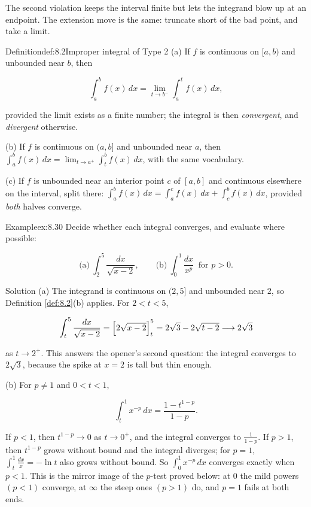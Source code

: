 \documentclass[a4paper,12pt,oneside]{memoir}
\begin{document}
The second violation keeps the interval finite but lets the integrand blow up at an endpoint. The extension move is the same: truncate short of the bad point, and take a limit.

\begin{envdefinition}{Definition}{def:8.2}{Improper integral of Type 2}
(a) If \(f\) is continuous on \([a, b)\) and unbounded near \(b\), then

\[ \int_{a}^{b} f(x)\,dx = \lim_{t \to b^{-}} \int_{a}^{t} f(x)\,dx, \]

provided the limit exists as a finite number; the integral is then \emph{convergent}, and \emph{divergent} otherwise.

(b) If \(f\) is continuous on \((a, b]\) and unbounded near \(a\), then \(\displaystyle\int_{a}^{b} f(x)\,dx = \lim_{t \to a^{+}} \int_{t}^{b} f(x)\,dx\), with the same vocabulary.

(c) If \(f\) is unbounded near an interior point \(c\) of \([a, b]\) and continuous elsewhere on the interval, split there: \(\displaystyle\int_{a}^{b} f(x)\,dx = \int_{a}^{c} f(x)\,dx + \int_{c}^{b} f(x)\,dx\), provided \emph{both} halves converge.
\end{envdefinition}
\begin{workedexample}
\begin{envexample}{Example}{ex:8.30}{}
Decide whether each integral converges, and evaluate where possible:

\[ \text{(a)}\ \int_{2}^{5} \frac{dx}{\sqrt{x - 2}}, \qquad \text{(b)}\ \int_{0}^{1} \frac{dx}{x^{p}} \ \text{ for } p > 0. \]
\end{envexample}
\begin{envsolution}{Solution}{}{}
(a) The integrand is continuous on \((2, 5]\) and unbounded near \(2\), so Definition \ref{def:8.2}(b) applies. For \(2 < t < 5\),

\[ \int_{t}^{5} \frac{dx}{\sqrt{x - 2}} = \Bigl[2\sqrt{x - 2}\Bigr]_{t}^{5} = 2\sqrt{3} - 2\sqrt{t - 2} \longrightarrow 2\sqrt{3} \]

as \(t \to 2^{+}\). This answers the opener’s second question: the integral converges to \(2\sqrt{3}\), because the spike at \(x = 2\) is tall but thin enough.

(b) For \(p \ne 1\) and \(0 < t < 1\),

\[ \int_{t}^{1} x^{-p}\,dx = \frac{1 - t^{1 - p}}{1 - p}. \]

If \(p < 1\), then \(t^{1-p} \to 0\) as \(t \to 0^{+}\), and the integral converges to \(\tfrac{1}{1 - p}\). If \(p > 1\), then \(t^{1-p}\) grows without bound and the integral diverges; for \(p = 1\), \(\int_{t}^{1} \tfrac{dx}{x} = -\ln t\) also grows without bound. So \(\int_{0}^{1} x^{-p}\,dx\) converges exactly when \(p < 1\). This is the mirror image of the \(p\)-test proved below: at \(0\) the mild powers \((p < 1)\) converge, at \(\infty\) the steep ones \((p > 1)\) do, and \(p = 1\) fails at both ends. \qedmark
\end{envsolution}
\end{workedexample}
\end{document}
